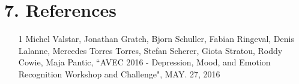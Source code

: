 \documentclass{article}
\begin{document}
	\section{7. References}
	\begin{itemize}
		\item
		[1] Michel Valstar, Jonathan Gratch, Bjorn Schuller, Fabian Ringeval, Denis Lalanne, Mercedes Torres Torres, Stefan Scherer, Giota Stratou, Roddy Cowie, Maja Pantic, ``AVEC 2016 - Depression, Mood, and Emotion Recognition Workshop and Challenge", MAY. 27, 2016 \\
	\end{itemize}
\end{document}
